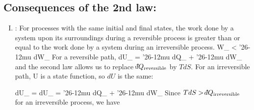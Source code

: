 \documentclass[12pt]{article}
\def\dbar{{\mathchar'26\mkern-12mu d}}
\begin{document}
\subsection{Consequences of the 2nd law:}
\begin{enumerate}[(I)]
\item {}: For processes with the same initial and final states, the work done by a system upon its surroundings during a reversible process is greater than or equal to the work done by a system during an irreversible process.
\beq \dbar W_ < \dbar W_ \ceq
For a reversible path, \beq dU_ = \dbar Q_ + \dbar W_ \ceq
and the second law allows us to replace $\dbar Q_\text{reversible}$ by $TdS$.  For an irreversible path, U is a state function, so $dU$ is the same:

\beq dU_ = dU_  = \dbar Q_ + \dbar W_ \ceq
Since $T dS > \dbar Q_\text{irreversible} $ for an irreversible process, we have


\end{enumerate}
\end{document}

